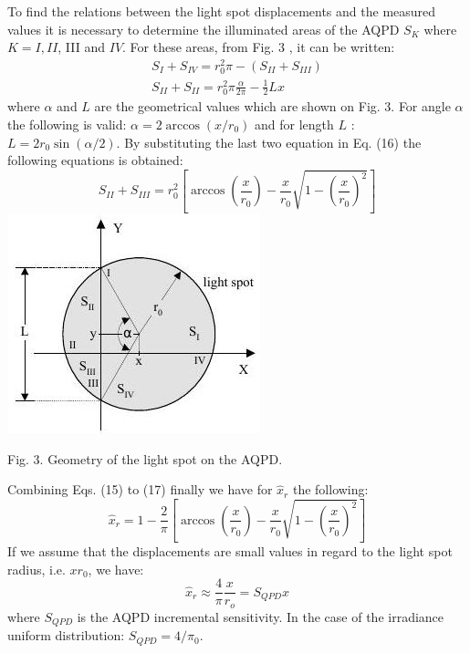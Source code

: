 \documentclass[10pt]{article}
\begin{document}
To find the relations between the light spot displacements and the measured values it is necessary to determine the illuminated areas of the AQPD \(S_{K}\) where \(K=I, I I\), III and \(I V\). For these areas, from Fig. 3 , it can be written:
\[
\begin{array}{l}
S_{I}+S_{I V}=r_{0}^{2} \pi-\left(S_{I I}+S_{I I I}\right) \\
S_{I I}+S_{I I}=r_{0}^{2} \pi \frac{\alpha}{2 \pi}-\frac{1}{2} L x
\end{array}
\]
where \(\alpha\) and \(L\) are the geometrical values which are shown on Fig. 3. For angle \(\alpha\) the following is valid: \(\alpha=2 \arccos \left(x / r_{0}\right)\) and for length \(L\) : \(L=2 r_{0} \sin (\alpha / 2)\). By substituting the last two equation in Eq. (16) the following equations is obtained:
\[
S_{I I}+S_{I I I}=r_{0}^{2}\left[\arccos \left(\frac{x}{r_{0}}\right)-\frac{x}{r_{0}} \sqrt{1-\left(\frac{x}{r_{0}}\right)^{2}}\right]
\]
\includegraphics[max width=\textwidth]{d2750892714501b765cfde22b041f38a-04}

Fig. 3. Geometry of the light spot on the AQPD.

Combining Eqs. (15) to (17) finally we have for \(\hat{x}_{r}\) the following:
\[
\hat{x}_{r}=1-\frac{2}{\pi}\left[\arccos \left(\frac{x}{r_{0}}\right)-\frac{x}{r_{0}} \sqrt{1-\left(\frac{x}{r_{0}}\right)^{2}}\right]
\]
If we assume that the displacements are small values in regard to the light spot radius, i.e. \(x r_{0}\), we have:
\[
\hat{x}_{r} \approx \frac{4}{\pi} \frac{x}{r_{o}}=S_{Q P D} x
\]
where \(S_{Q P D}\) is the AQPD incremental sensitivity. In the case of the irradiance uniform distribution: \(S_{Q P D}=4 / \pi_{0}\).
\end{document}
